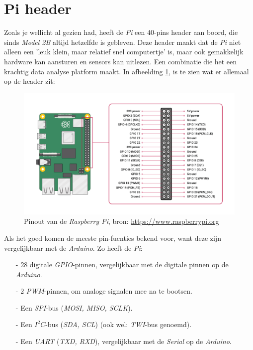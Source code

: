 \newpage 

\section{Pi header}
Zoals je wellicht al gezien had, heeft de \textit{Pi} een $40$-pins header aan boord, die sinds \textit{Model 2B} altijd hetzelfde is gebleven. Deze header maakt dat de \textit{Pi} niet alleen een 'leuk klein, maar relatief snel computertje' is, maar ook gemakkelijk hardware kan aansturen en sensors kan uitlezen. Een combinatie die het een krachtig data analyse platform maakt. In afbeelding \ref{fig:pi_header}, is te zien wat er allemaal op de header zit: 

\begin{figure}[h!]
\centering\includegraphics[scale=0.28]{Pictures/chapter05/pi_pinout.png}
\caption{Pinout van de \textit{Raspberry Pi}, bron: \href{https://www.raspberrypi.org/documentation/usage/gpio/}{https://www.raspberrypi.org}}
\label{fig:pi_header} %
\end{figure}

Als het goed komen de meeste pin-fucnties bekend voor, want deze zijn vergelijkbaar met de \textit{Arduino}. Zo heeft de \textit{Pi}:
\begin{enumerate}
	\item[-] $28$ digitale \textit{GPIO}-pinnen, vergelijkbaar met de digitale pinnen op de \textit{Arduino}.
	\item[-] $2$ \textit{PWM}-pinnen, om analoge signalen mee na te bootsen.
	\item[-] Een \textit{SPI}-bus (\textit{MOSI, MISO, SCLK}).
	\item[-] Een \textit{$I^2C$}-bus (\textit{SDA, SCL}) (ook wel: \textit{TWI}-bus genoemd). 
	\item[-] Een \textit{UART} (\textit{TXD, RXD}), vergelijkbaar met de \textit{Serial} op de \textit{Arduino}.
\end{enumerate}

